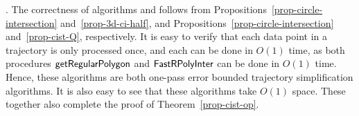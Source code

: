 .
%
The correctness of algorithms \cist and \cista follows from Propositions~\ref{prop-circle-intersection} and~\ref{prop-3d-ci-half}, and Propositions~\ref{prop-circle-intersection} and~\ref{prop-cist-Q}, respectively.
%
It is easy to verify that each data point in a trajectory is only processed once, and each can be done in $O(1)$ time,
as both procedures  ${\mathsf{getRegularPolygon}}$ and ${\mathsf{FastRPolyInter}}$ can be done in $O(1)$ time.
Hence, these algorithms are both one-pass error bounded trajectory simplification algorithms.
It is also easy to see that these algorithms take $O(1)$ space.
These together also complete the proof of Theorem~\ref{prop-cist-op}.





